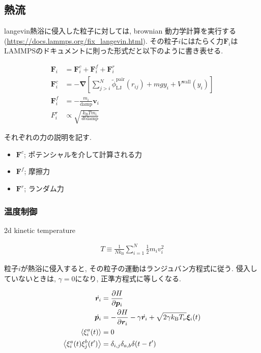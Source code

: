 \documentclass[dvipdfmx]{jsarticle}
\numberwithin{equation}{subsection}
\begin{document}
\subsection{熱流}

langevin熱浴に侵入した粒子に対しては, brownian 動力学計算を実行する(\url{https://docs.lammps.org/fix_langevin.html}). その粒子$i$にはたらく力$\bm{F}_i$はLAMMPSのドキュメントに則った形式だと以下のように書き表せる.

\begin{align}
  \bm{F}_i &= \bm{F}_i^c + \bm{F}_i^f + \bm{F}_i^r \\
  \bm{F}_i^c &= - \bm{\nabla} 
  \left[
    \sum_{j > i}^{N}
        \tilde{\phi}_{\text{LJ}}^{\text{pair}}(r_{ij})
      + mgy_i +V^{\text{wall}}(y_i)
  \right]  \\
  \bm{F}_i^f &= -\frac{m_i}{\text{damp}}\bm{v}_i \\
  F_i^r &\propto \sqrt{\frac{k_\text{B} Tm_i}{dt \text{damp}}}
\end{align}

それぞれの力の説明を記す.

\begin{itemize}
  \item $\bm{F}^c$; ポテンシャルを介して計算される力
  \item $\bm{F}^f$; 摩擦力
  \item $\bm{F}^r$; ランダム力
\end{itemize}


\subsubsection{温度制御}


2d kinetic temperature

\begin{align}
  T \equiv \frac{1}{Nk_{\text{B}}}\sum_{i=1}^{N} \frac{1}{2}m_i v_{i}^2
\end{align}

粒子$i$が熱浴に侵入すると, その粒子の運動はランジュバン方程式に従う. 侵入していないときは, $\gamma = 0$になり, 正準方程式に等しくなる.

\begin{align}
  \dot{\bm{r}_i} &= \pdv{H}{\bm{p}_i} \\
  \dot{\bm{p}_i} &= - \pdv{H}{\bm{r}_i} - \gamma \dot{\bm{r}_i} + \sqrt{2 \gamma k_{\text{B}}T_{\nu}}\bm{\xi}_i (t) \\
  \expval{\xi_{i}^{a}(t)} &= 0 \\
  \expval{\xi_{i}^{a}(t)\xi_{j}^{b}(t')} &= \delta_{i,j} \delta_{a,b}\delta (t-t') 
\end{align}
\end{document}
